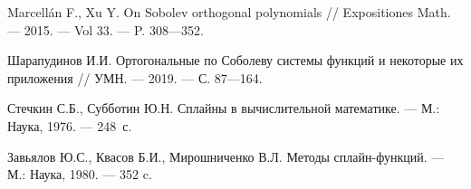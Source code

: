 \begin{thebibliography}{111}


  Marcellán F., Xu Y. 
  On Sobolev orthogonal polynomials
  //
  Expositiones Math.
  --- 2015.
  --- Vol 33.
  --- P. 308---352.

  Шарапудинов И.И. 
  Ортогональные по Соболеву системы функций и некоторые их приложения
  //
  УМН.
  --- 2019.
  --- С. 87---164.

  Стечкин С.Б., Субботин Ю.Н.
  Сплайны в вычислительной математике.
  --- М.: Наука, 1976.
  --- 248~с.

  Завьялов Ю.С., Квасов Б.И., Мирошниченко В.Л.
  Методы сплайн-функций.
  --- М.: Наука, 1980.
  --- 352 c.

\end{thebibliography} 